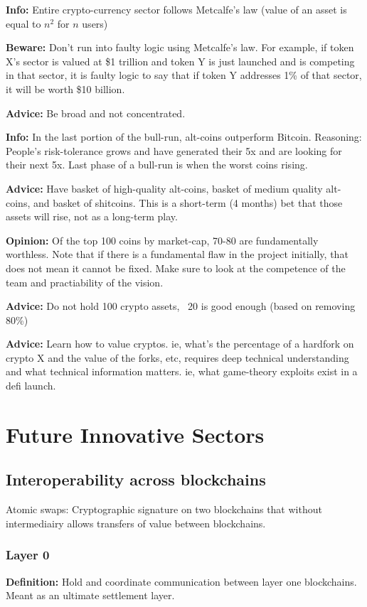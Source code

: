 \documentclass[10pt,twocolumn]{article}
\begin{document}
{\bf Info:} Entire crypto-currency sector follows Metcalfe's law (value of an
asset is equal to $n^2$ for $n$ users) 

{\bf Beware:} Don't run into faulty logic using Metcalfe's law. For example, if
token X's sector is valued at \$1 trillion and token Y is just launched and is
competing in that sector, it is faulty logic to say that if token Y addresses
1\% of that sector, it will be worth \$10 billion. 

{\bf Advice:} Be broad and not concentrated. 

{\bf Info:} In the last portion of the bull-run, alt-coins outperform Bitcoin.
Reasoning: People's risk-tolerance grows and have generated their 5x and are
looking for their next 5x. Last phase of a bull-run is when the worst coins
rising. 

{\bf Advice:} Have basket of high-quality alt-coins, basket of medium quality
alt-coins, and basket of shitcoins. This is a short-term (4 months) bet that
those assets will rise, not as a long-term play. 

{\bf Opinion:} Of the top 100 coins by market-cap, 70-80 are fundamentally
worthless. Note that if there is a fundamental flaw in the project initially,
that does not mean it cannot be fixed. Make sure to look at the competence of
the team and practiability of the vision. 

{\bf Advice:} Do not hold 100 crypto assets, ~20 is good enough (based on
removing 80\%)

{\bf Advice:} Learn how to value cryptos. ie, what's the percentage of a
hardfork on crypto X and the value of the forks, etc, requires deep technical
understanding and what technical information matters. ie, what game-theory
exploits exist in a defi launch. 

\section{Future Innovative Sectors} %

\subsection{Interoperability across blockchains}
Atomic swaps: Cryptographic signature on two blockchains that without
intermediairy allows transfers of value between blockchains. 

\subsubsection{Layer 0}
{\bf Definition:} Hold and coordinate communication between layer one
blockchains. Meant as an ultimate settlement layer. 
\end{document}
